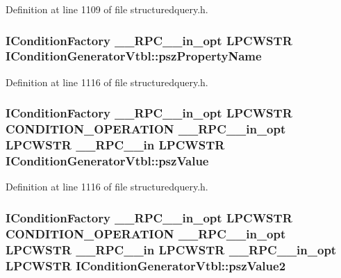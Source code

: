 Definition at line 1109 of file structuredquery.\+h.

\subsubsection[{\texorpdfstring{psz\+Property\+Name}{pszPropertyName}}]{ {\bf I\+Condition\+Factory} {\bf \+\_\+\+\_\+\+R\+P\+C\+\_\+\+\_\+in\+\_\+opt} {\bf L\+P\+C\+W\+S\+TR} I\+Condition\+Generator\+Vtbl\+::psz\+Property\+Name}\hypertarget{struct_i_condition_generator_vtbl_a4f731cf27f46fee73d21de9ecaaa95b1}{}\label{struct_i_condition_generator_vtbl_a4f731cf27f46fee73d21de9ecaaa95b1}


Definition at line 1116 of file structuredquery.\+h.

\subsubsection[{\texorpdfstring{psz\+Value}{pszValue}}]{ {\bf I\+Condition\+Factory} {\bf \+\_\+\+\_\+\+R\+P\+C\+\_\+\+\_\+in\+\_\+opt} {\bf L\+P\+C\+W\+S\+TR} {\bf C\+O\+N\+D\+I\+T\+I\+O\+N\+\_\+\+O\+P\+E\+R\+A\+T\+I\+ON} {\bf \+\_\+\+\_\+\+R\+P\+C\+\_\+\+\_\+in\+\_\+opt} {\bf L\+P\+C\+W\+S\+TR} {\bf \+\_\+\+\_\+\+R\+P\+C\+\_\+\+\_\+in} {\bf L\+P\+C\+W\+S\+TR} I\+Condition\+Generator\+Vtbl\+::psz\+Value}\hypertarget{struct_i_condition_generator_vtbl_ae7a462c9235ac4c4bc600f806c54ca90}{}\label{struct_i_condition_generator_vtbl_ae7a462c9235ac4c4bc600f806c54ca90}


Definition at line 1116 of file structuredquery.\+h.

\subsubsection[{\texorpdfstring{psz\+Value2}{pszValue2}}]{ {\bf I\+Condition\+Factory} {\bf \+\_\+\+\_\+\+R\+P\+C\+\_\+\+\_\+in\+\_\+opt} {\bf L\+P\+C\+W\+S\+TR} {\bf C\+O\+N\+D\+I\+T\+I\+O\+N\+\_\+\+O\+P\+E\+R\+A\+T\+I\+ON} {\bf \+\_\+\+\_\+\+R\+P\+C\+\_\+\+\_\+in\+\_\+opt} {\bf L\+P\+C\+W\+S\+TR} {\bf \+\_\+\+\_\+\+R\+P\+C\+\_\+\+\_\+in} {\bf L\+P\+C\+W\+S\+TR} {\bf \+\_\+\+\_\+\+R\+P\+C\+\_\+\+\_\+in\+\_\+opt} {\bf L\+P\+C\+W\+S\+TR} I\+Condition\+Generator\+Vtbl\+::psz\+Value2}\hypertarget{struct_i_condition_generator_vtbl_a28131340eeac859515d0393281301a5a}{}\label{struct_i_condition_generator_vtbl_a28131340eeac859515d0393281301a5a}


